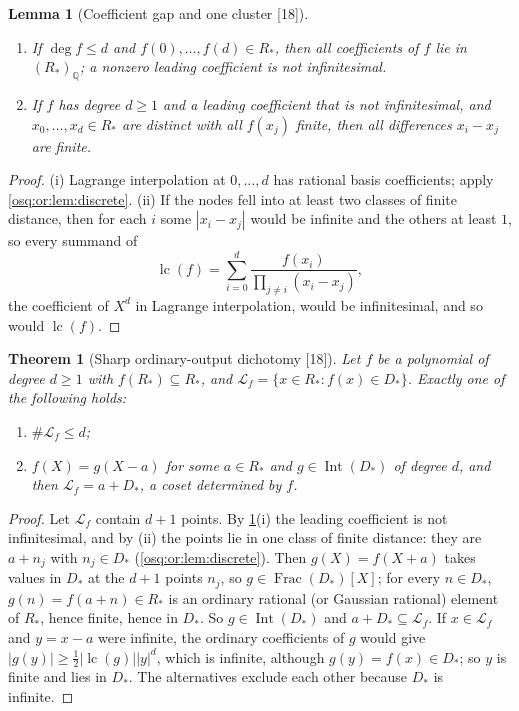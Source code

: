 \documentclass[11pt,letterpaper]{article}
\numberwithin{equation}{section}
\newtheorem{theorem}{Theorem}[section]
\newtheorem{lemma}[lemma]{Lemma}
\theoremstyle{definition}
\theoremstyle{remark}
\theoremstyle{plain}
\newcommand{\Q}{\mathbb Q}
\newcommand{\Frac}{\operatorname{Frac}}
\newcommand{\Int}{\operatorname{Int}}
\newcommand{\lc}{\operatorname{lc}}
\newcommand{\src}[1]{\textup{\textsf{[#1]}}}
\begin{document}
\begin{lemma}[Coefficient gap and one cluster \src{18}]\label{osq:or:lem:cluster}
\leavevmode
\begin{enumerate}
\item If $\deg f\le d$ and $f(0),\dots,f(d)\in R_*$, then all coefficients of $f$ lie in $(R_*)_\Q$; a nonzero leading coefficient is not infinitesimal.
\item If $f$ has degree $d\ge1$ and a leading coefficient that is not infinitesimal, and $x_0,\dots,x_d\in R_*$ are distinct with all $f(x_j)$ finite,
then all differences $x_i-x_j$ are finite.
\end{enumerate}
\end{lemma}
\begin{proof}
(i) Lagrange interpolation at $0,\dots,d$ has rational basis coefficients; apply \cref{osq:or:lem:discrete}. (ii) If the nodes fell into at least two
classes of finite distance, then for each $i$ some $|x_i-x_j|$ would be infinite and the others at least $1$, so every summand of
\[
 \lc(f)=\sum_{i=0}^d\frac{f(x_i)}{\prod_{j\ne i}(x_i-x_j)},
\]
the coefficient of $X^d$ in Lagrange interpolation, would be infinitesimal, and so would $\lc(f)$.
\end{proof}

\begin{theorem}[Sharp ordinary-output dichotomy \src{18}]\label{osq:or:thm:dichotomy}
Let $f$ be a polynomial of degree $d\ge1$ with $f(R_*)\subseteq R_*$, and $\mathcal L_f=\{x\in R_*:f(x)\in D_*\}$. Exactly one of the following holds:
\begin{enumerate}
\item $\#\mathcal L_f\le d$;
\item $f(X)=g(X-a)$ for some $a\in R_*$ and $g\in\Int(D_*)$ of degree $d$, and then $\mathcal L_f=a+D_*$, a coset determined by $f$.
\end{enumerate}
\end{theorem}
\begin{proof}
Let $\mathcal L_f$ contain $d+1$ points. By \cref{osq:or:lem:cluster}(i) the leading coefficient is not infinitesimal, and by (ii) the points lie in
one class of finite distance: they are $a+n_j$ with $n_j\in D_*$ (\cref{osq:or:lem:discrete}). Then $g(X)=f(X+a)$ takes values in $D_*$ at the $d+1$
points $n_j$, so $g\in\Frac(D_*)[X]$; for every $n\in D_*$, $g(n)=f(a+n)\in R_*$ is an ordinary rational (or Gaussian rational) element of $R_*$, hence
finite, hence in $D_*$. So $g\in\Int(D_*)$ and $a+D_*\subseteq\mathcal L_f$. If $x\in\mathcal L_f$ and $y=x-a$ were infinite, the ordinary
coefficients of $g$ would give $|g(y)|\ge\frac12|\lc(g)||y|^d$, which is infinite, although $g(y)=f(x)\in D_*$; so $y$ is finite and lies in $D_*$.
The alternatives exclude each other because $D_*$ is infinite.
\end{proof}
\end{document}
